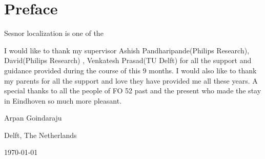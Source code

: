 \chapter*{Preface}
Sesnor localization is one of the 

\vspace{1\baselineskip}

\noindent
I would like to thank my supervisor Ashish Pandharipande(Philips Research), David(Philips Research) , Venkatesh Prasad(TU Delft) for all the support and guidance provided during the course of this 9 months. I would also like to thank my parents for all the support and love they have provided me all these years. A special thanks to all the people of FO 52 past and the present who made the stay in Eindhoven so much more pleasant.

\vspace{1\baselineskip}

\noindent
Arpan Goindaraju

\vspace{1\baselineskip}

\noindent
Delft, The Netherlands

\noindent
\today
